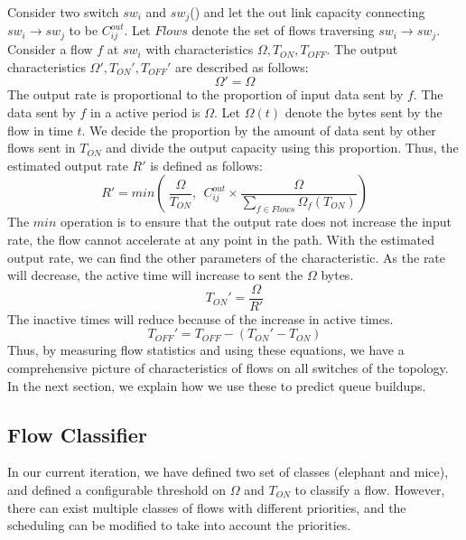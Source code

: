 Consider two switch $sw_i$ and $sw_j$() and let the out link
capacity connecting $sw_i \rightarrow sw_j$ to be $C_{ij}^{out}$. Let $Flows$
denote the set of flows traversing $sw_i \rightarrow sw_j$. Consider a flow $f$ at $sw_i$ 
with characteristics $\Omega, T_{ON}, T_{OFF}$. The output characteristics $\Omega',T_{ON}', T_{OFF}'$  are described as follows: 
\begin{equation}
	\Omega' = \Omega
\end{equation} 
The output rate is proportional to the proportion of input data sent by $f$. The data sent by
$f$ in a active period is $\Omega$. Let $\Omega(t)$ denote the bytes sent by the flow in time $t$.
We decide the proportion by the amount of data sent by other flows sent in $T_{ON}$ and
divide the output capacity using this proportion. Thus, the estimated output rate $R'$ is defined as follows: 
\begin{equation}
	R' = min(\ \frac{\Omega}{T_{ON}}, \ \  C_{ij}^{out} \times \frac{\Omega}{\sum_{f \in Flows} \Omega_f(T_{ON}) })
\end{equation}
The $min$ operation is to ensure that the output rate does not increase the input rate,
the flow cannot accelerate at any point in the path. With the estimated output rate, we can find the other parameters of the characteristic. As the rate will decrease, the active time will increase to sent the $\Omega$ bytes.
\begin{equation}
	T_{ON}' = \frac{\Omega}{R'}
\end{equation}
The inactive times will reduce because of the increase in active times. 
\begin{equation}
	T_{OFF}' = T_{OFF} - ( T_{ON}'  - T_{ON} )
\end{equation}
Thus, by measuring flow statistics and using these equations, we have a comprehensive picture of characteristics of flows on all switches of the topology. In the next section, we explain how we use these to predict queue buildups.

\subsection{Flow Classifier}
In our current iteration, we have defined two set of classes (elephant and mice), and defined 
a configurable threshold on $\Omega$ and $T_{ON}$ to classify a flow. However, there can
exist multiple classes of flows with different priorities, and the scheduling can be modified to
take into account the priorities.

